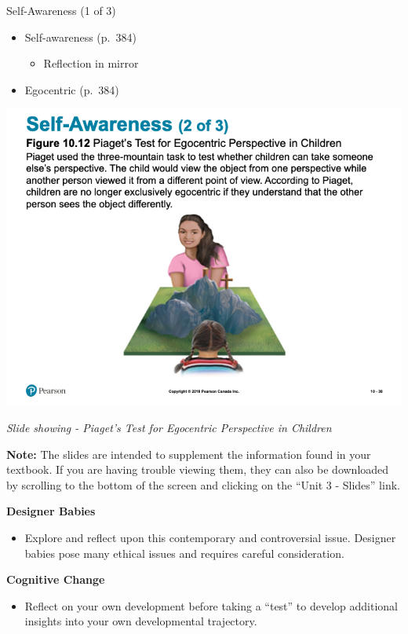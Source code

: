 \documentclass[
]{book}
\providecommand{\tightlist}{%
  \setlength{\itemsep}{0pt}\setlength{\parskip}{0pt}}
\begin{document}
Self-Awareness (1 of 3)

\begin{itemize}
\tightlist
\item
  Self-awareness (p.~384)

  \begin{itemize}
  \tightlist
  \item
    Reflection in mirror
  \end{itemize}
\item
  Egocentric (p.~384)
\end{itemize}

\includegraphics{assets/unit_3/slide_38.png}

\emph{Slide showing - Piaget's Test for Egocentric Perspective in Children}

\textbf{Note:} The slides are intended to supplement the information found in your textbook. If you are having trouble viewing them, they can also be downloaded by scrolling to the bottom of the screen and clicking on the ``Unit 3 - Slides'' link.

\textbf{Designer Babies}

\begin{itemize}
\tightlist
\item
  Explore and reflect upon this contemporary and controversial issue. Designer babies pose many ethical issues and requires careful consideration.
\end{itemize}

\textbf{Cognitive Change}

\begin{itemize}
\tightlist
\item
  Reflect on your own development before taking a ``test'' to develop additional insights into your own developmental trajectory.
\end{itemize}
\end{document}
